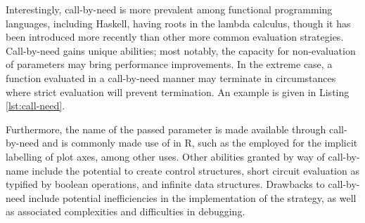 Interestingly, call-by-need is more prevalent among functional programming languages, including Haskell, having roots in the lambda calculus, though it has been introduced more recently than other more common evaluation strategies\cite{nita2017haskell}.
Call-by-need gains unique abilities; most notably, the capacity for non-evaluation of parameters may bring performance improvements.
In the extreme case, a function evaluated in a call-by-need manner may terminate in circumstances where strict evaluation will prevent termination.
An example is given in Listing \cref{lst:call-need}.


Furthermore, the name of the passed parameter is made available through call-by-need and is commonly made use of in R, such as the  employed for the implicit labelling of plot axes, among other uses.
Other abilities granted by way of call-by-name include the potential to create control structures, short circuit evaluation as typified by boolean operations, and infinite data structures.
Drawbacks to call-by-need include potential inefficiencies in the implementation of the strategy, as well as associated complexities and difficulties in debugging\cite{nilsson1999lazydebug}.

